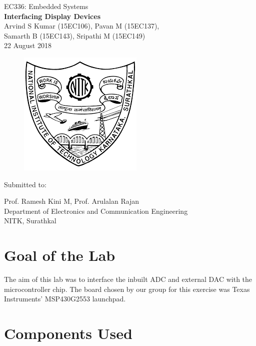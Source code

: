 \documentclass[12pt, letterpaper]{article}
\begin{document}
\begin{titlepage}

\begin{center}
	\large{EC336: Embedded Systems}\\
	\huge{\textbf{Interfacing Display Devices}}\\
	\large{Arvind S Kumar (15EC106), Pavan M (15EC137),\\ Samarth B (15EC143), Sripathi M (15EC149)}\\
	\large{22 August 2018}
\end{center}	

\begin{figure}[!h]
	\centering
	\includegraphics[scale=0.8]{NITKEmblem.png}
	\label{fig:NITKEmblem}
\end{figure}	
\begin{center}
	
\huge{Submitted to:}\\
\begin{large}
Prof. Ramesh Kini M, Prof. Arulalan Rajan\\
Department of Electronics and Communication Engineering\\
NITK, Surathkal
\end{large}

\end{center}

\end{titlepage}

\section{Goal of the Lab}

The aim of this lab was to interface the inbuilt ADC and external DAC  with the microcontroller chip. The board chosen by our group for this exercise was Texas Instruments' MSP430G2553 launchpad.

\section{Components Used}
\end{document}
